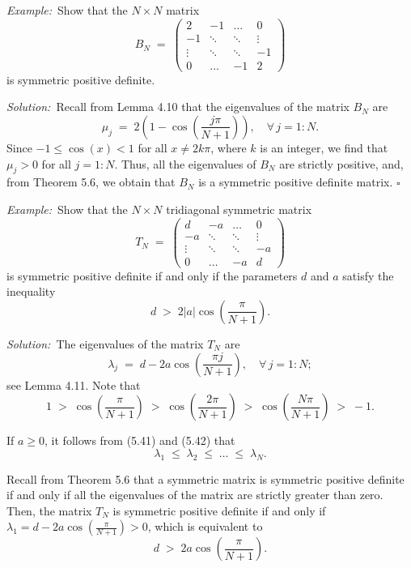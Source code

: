 \par\medskip\noindent\textit{Example:}\ Show that the $N \times N$ matrix
\[
B_N \;=\; \begin{pmatrix}
2 & -1 & \dots & 0\\
-1 & \ddots & \ddots & \vdots\\
\vdots & \ddots & \ddots & -1\\
0 & \dots & -1 & 2
\end{pmatrix}
\]
is symmetric positive definite.

\par\medskip\noindent\textit{Solution:}\ Recall from Lemma 4.10 that the eigenvalues of
the matrix $B_N$ are
\[
\mu_j \;=\; 2\left(1-\cos\left(\frac{j\pi}{N+1}\right)\right), \quad \forall\, j = 1:N.
\]
Since $-1 \leq \cos(x) < 1$ for all $x \neq 2k\pi$, where $k$ is an integer, we find that
$\mu_j > 0$ for all $j = 1:N$. Thus, all the eigenvalues of $B_N$ are strictly positive,
and, from Theorem 5.6, we obtain that $B_N$ is a symmetric positive definite matrix.
\hfill$\square$
\par\medskip

\par\medskip\noindent\textit{Example:}\ Show that the $N \times N$ tridiagonal symmetric
matrix
\begin{equation}
T_N \;=\; \begin{pmatrix}
d & -a & \dots & 0\\
-a & \ddots & \ddots & \vdots\\
\vdots & \ddots & \ddots & -a\\
0 & \dots & -a & d
\end{pmatrix}
\end{equation}
is symmetric positive definite if and only if the parameters $d$ and $a$ satisfy the
inequality
\begin{equation}
d \;>\; 2|a|\cos\left(\frac{\pi}{N+1}\right).
\end{equation}

\par\medskip\noindent\textit{Solution:}\ The eigenvalues of the matrix $T_N$ are
\begin{equation}
\lambda_j \;=\; d - 2a\cos\left(\frac{\pi j}{N+1}\right), \quad \forall\, j = 1:N;
\end{equation}
see Lemma 4.11. Note that
\begin{equation}
1 \;>\; \cos\left(\frac{\pi}{N+1}\right) \;>\; \cos\left(\frac{2\pi}{N+1}\right) \;>\; \cos\left(\frac{N\pi}{N+1}\right) \;>\; -1.
\end{equation}

If $a \geq 0$, it follows from (5.41) and (5.42) that
\[
\lambda_1 \;\leq\; \lambda_2 \;\leq\; \dots \;\leq\; \lambda_N.
\]

Recall from Theorem 5.6 that a symmetric matrix is symmetric positive definite if and
only if all the eigenvalues of the matrix are strictly greater than zero. Then, the
matrix $T_N$ is symmetric positive definite if and only if
$\lambda_1 = d - 2a\cos\left(\frac{\pi}{N+1}\right) > 0$, which is equivalent to
\begin{equation}
d \;>\; 2a\cos\left(\frac{\pi}{N+1}\right).
\end{equation}
